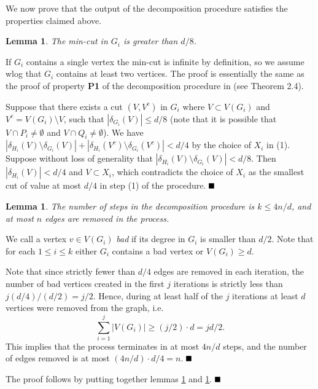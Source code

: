 \documentclass[11pt]{article}
\newcommand{\qed}{\mbox{}\hspace*{\fill}\nolinebreak\mbox{$\rule{0.6em}{0.6em}$}
}
\newtheorem{lemma}[theorem]{Lemma}
\newenvironment{proof}{{\bf Proof:}}{$\qed$\par}
\newenvironment{proofof}[1]{\noindent{\bf Proof of #1:}}{$\qed$\par}
\begin{document}
We now prove that the output of the decomposition procedure satisfies the properties claimed above.
\begin{lemma}\label{lm:mincut}
The min-cut in $G_i$ is greater than $d/8$.
\end{lemma}
\begin{proof}
If $G_i$ contains a single vertex the min-cut is infinite by definition, so we assume wlog that $G_i$ contains at least two vertices.
The proof is essentially the same as the proof of property \textbf{P1} of the decomposition procedure in \cite{gkk:rbp08} (see Theorem 2.4).

Suppose that there exists a cut $(V, V^c)$ in $G_i$ where $V\subset V(G_i)$ and
$V^c=V(G_i)\setminus V$, such that $|\delta_{G_i}(V)|\leq d/8$ (note that it is possible that $V\cap P_i\neq \emptyset$ and $V\cap Q_i\neq \emptyset$).  We have $|\delta_{H_i}(V)\setminus \delta_{G_i}(V)|+|\delta_{H_i}(V^c)\setminus \delta_{G_i}(V^c)|< d/4$ by the choice of $X_i$ in (1). Suppose without loss of generality that $|\delta_{H_i}(V)\setminus \delta_{G_i}(V)|<d/8$.
Then $|\delta_{H_i}(V)|< d/4$ and $V\subset X_i$, which contradicts the choice of $X_i$ as the smallest cut of value at most $d/4$ in step (1) of the procedure.
\end{proof}


\begin{lemma} \label{lm:edges-removed}
The number of steps in the decomposition procedure is $k\leq 4n/d$, and at most $n$ edges are removed in the process.
\end{lemma}
\begin{proof}
We call a vertex $v\in V(G_i)$ {\em bad} if its degree in $G_i$ is smaller than $d/2$. Note that for each $1\leq i\leq k$ either $G_i$ contains a bad vertex or $V(G_i)\geq d$. 

Note that since strictly fewer than $d/4$ edges are removed in each iteration, the number of bad vertices created in the first $j$ iterations is strictly less than $j(d/4)/(d/2)=j/2$.  Hence, during at least half of the $j$ iterations at least $d$ vertices were removed from the graph, i.e.
\begin{equation*}
\sum_{i=1}^j |V(G_i)|\geq (j/2)\cdot d=jd/2.
\end{equation*}
This implies that the process terminates in at most $4n/d$ steps, and the number of edges removed is at most $(4n/d)\cdot d/4=n$.
\end{proof}
\begin{proofof}{Theorem \ref{thm:decomposition}}
The proof follows by putting together lemmas \ref{lm:mincut} and \ref{lm:edges-removed}.
\end{proofof}
\end{document}
